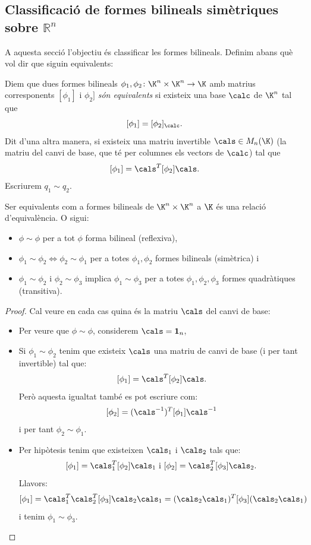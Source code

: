 \subsection{Classificació de formes bilineals simètriques sobre \texorpdfstring{$\mathbb{R}^n$}{Rn}}
A aquesta secció l'objectiu és classificar les formes bilineals. Definim abans què vol dir que siguin equivalents:
\begin{definicio}
Diem que dues formes bilineals $\phi_1,\phi_2\colon \K^n\times\K^n\to \K$ amb matrius corresponents $[\phi_1]$ i $\phi_2]$ \emph{són equivalents} si existeix una base $\calc$ de $\K^n$ tal que
\[
[\phi_1]=[\phi_2]_\calc .
\]
Dit d'una altra manera, si existeix una matriu invertible $\cals\in M_n(\K)$ (la matriu del canvi de base, que té per columnes els vectors de $\calc$) tal que
\[
[\phi_1]=\cals^T [\phi_2] \cals.
\]
Escriurem $q_1\sim q_2$.
\end{definicio}
\begin{lema}
Ser equivalents com a formes bilineals de $\K^n\times \K^n$ a $\K$ és una relació d'equivalència. O sigui:
\begin{itemize}
    \item $\phi \sim \phi$ per a tot $\phi$ forma bilineal (reflexiva),
    \item $\phi_1\sim \phi_2 \Leftrightarrow \phi_2 \sim \phi_1$ per a totes $\phi_1, \phi_2$ formes bilineals (simètrica) i
    \item $\phi_1\sim \phi_2$ i $\phi_2\sim \phi_3$ implica $\phi_1\sim \phi_3$ per a totes $\phi_1,\phi_2,\phi_3$ formes quadràtiques (transitiva).
\end{itemize}
\end{lema}
\begin{proof}
Cal veure en cada cas quina és la matriu $\cals$ del canvi de base:
\begin{itemize}
    \item Per veure que $\phi\sim \phi$, considerem $\cals=\1_n$,
    \item Si $\phi_1\sim \phi_2$ tenim que existeix $\cals$ una matriu de canvi de base (i per tant invertible) tal que:
    \[
    [\phi_1]=\cals^T [\phi_2] \cals.
    \]
    Però aquesta igualtat també es pot escriure com:
    \[
    [\phi_2]=(\cals^{-1})^T [\phi_1] \cals^{-1}
    \]
    i per tant $\phi_2\sim \phi_1$.
    \item Per hipòtesis tenim que existeixen $\cals_1$ i $\cals_2$ tals que:
    \[
    [\phi_1]=\cals_1^T [\phi_2] \cals_1
    \text{ i }
    [\phi_2]=\cals_2^T [\phi_3] \cals_2.
    \]
    Llavors:
    \[
    [\phi_1]=\cals_1^T \cals_2^T [\phi_3] \cals_2 \cals_1=
    (\cals_2 \cals_1)^T [\phi_3] (\cals_2 \cals_1)
    \]
    i tenim $\phi_1\sim \phi_3$.
\end{itemize}
\end{proof}

